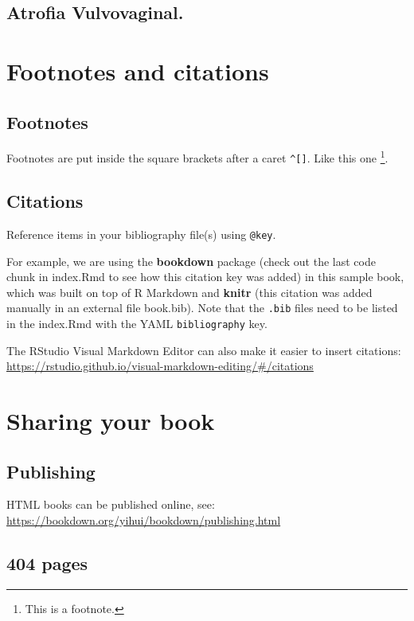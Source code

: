 \documentclass[
  spanish,
]{article}
\begin{document}
\subsection{Atrofia Vulvovaginal.}\label{atrofia-vulvovaginal.}

\section{Footnotes and citations}\label{footnotes-and-citations}

\subsection{Footnotes}\label{footnotes}

Footnotes are put inside the square brackets after a caret \texttt{\^{}{[}{]}}. Like this one \footnote{This is a footnote.}.

\subsection{Citations}\label{citations}

Reference items in your bibliography file(s) using \texttt{@key}.

For example, we are using the \textbf{bookdown} package \citep{R-bookdown} (check out the last code chunk in index.Rmd to see how this citation key was added) in this sample book, which was built on top of R Markdown and \textbf{knitr} \citep{xie2015} (this citation was added manually in an external file book.bib).
Note that the \texttt{.bib} files need to be listed in the index.Rmd with the YAML \texttt{bibliography} key.

The RStudio Visual Markdown Editor can also make it easier to insert citations: \url{https://rstudio.github.io/visual-markdown-editing/\#/citations}

\section{Sharing your book}\label{sharing-your-book}

\subsection{Publishing}\label{publishing}

HTML books can be published online, see: \url{https://bookdown.org/yihui/bookdown/publishing.html}

\subsection{404 pages}\label{pages}
\end{document}

